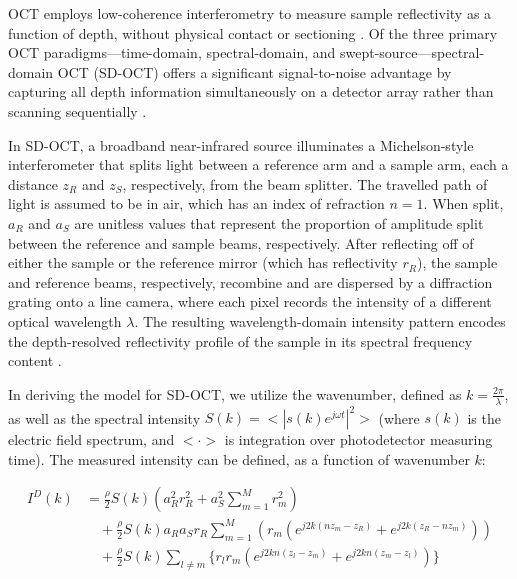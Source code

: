 \documentclass[10pt]{article}
\begin{document}
OCT employs low-coherence interferometry to measure sample reflectivity as a function of depth, without physical contact or sectioning \cite{izattTheoryOpticalCoherence2015}. Of the three primary OCT paradigms---time-domain, spectral-domain, and swept-source---spectral-domain OCT (SD-OCT) offers a significant signal-to-noise advantage by capturing all depth information simultaneously on a detector array rather than scanning sequentially \cite{izattTheoryOpticalCoherence2015}.

In SD-OCT, a broadband near-infrared source illuminates a Michelson-style interferometer that splits light between a reference arm and a sample arm, each a distance $z_R$ and $z_S$, respectively, from the beam splitter. The travelled path of light is assumed to be in air, which has an index of refraction $n=1$. When split, $a_R$ and $a_S$ are unitless values that represent the proportion of amplitude split between the reference and sample beams, respectively. After reflecting off of either the sample or the reference mirror (which has reflectivity $r_R$), the sample and reference beams, respectively, recombine and are dispersed by a diffraction grating onto a line camera, where each pixel records the intensity of a different optical wavelength $\lambda$. The resulting wavelength-domain intensity pattern encodes the depth-resolved reflectivity profile of the sample in its spectral frequency content \cite{izattTheoryOpticalCoherence2015,brianlfrostthesis}. 

In deriving the model for SD-OCT, we utilize the wavenumber, defined as $k=\frac{2\pi}{\lambda}$, as well as the spectral intensity $S(k) =< |s(k) e^{j\omega t} |^2 >$ (where $s(k)$ is the electric field spectrum, and $<\cdot>$ is integration over photodetector measuring time). The measured intensity can be defined, as a function of wavenumber $k$:

\begin{equation}
\begin{split}
I^D(k) &= \frac{\rho}{2} S(k) \left( a_R^2 r_R^2 + a_S^2 \sum_{m=1}^M r_m^2 \right) \\
&\quad + \frac{\rho}{2} S(k) a_R a_S r_R \sum_{m=1}^M \left( r_m \left( e^{j2k(nz_m-z_R)} + e^{j2k(z_R-nz_m)} \right) \right) \\
&\quad + \frac{\rho}{2} S(k) \sum_{l \neq m} \{ r_l r_m \left( e^{j2kn(z_l-z_m)} + e^{j2kn(z_m-z_l)} \right) \}
\end{split}
\label{eq:k_intensity}
\end{equation}
\end{document}
